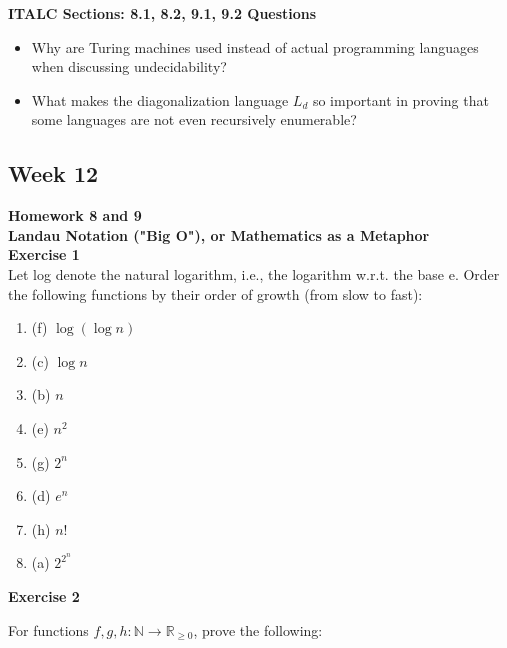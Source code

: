 \documentclass{article}
\theoremstyle{theorem}
\theoremstyle{definition}
\theoremstyle{remark}
\begin{document}
\textbf{ITALC Sections: 8.1, 8.2, 9.1, 9.2 Questions}
\begin{itemize}
  \item Why are Turing machines used instead of actual programming languages when discussing undecidability?
  \item What makes the diagonalization language \( L_d \) so important in proving that some languages are not even recursively enumerable?
\end{itemize}

\subsection{Week 12}
\textbf{Homework 8 and 9}\\
\textbf {Landau Notation ("Big O"), or Mathematics as a Metaphor}\\
\textbf{Exercise 1} \\
Let log denote the natural logarithm, i.e., the logarithm w.r.t. the base e. Order the following functions by their order of growth (from slow to fast):
\begin{enumerate}
  \item (f) \(\log(\log n)\)
  \item (c) \(\log n\)
  \item (b) \(n\)
  \item (e) \(n^2\)
  \item (g) \(2^n\)
  \item (d) \(e^n\)
  \item (h) \(n!\)
  \item (a) \(2^{2^n}\)
\end{enumerate}

\textbf{Exercise 2}

For functions \( f, g, h \colon \mathbb{N} \to \mathbb{R}_{\geq 0} \), prove the following:
\end{document}
